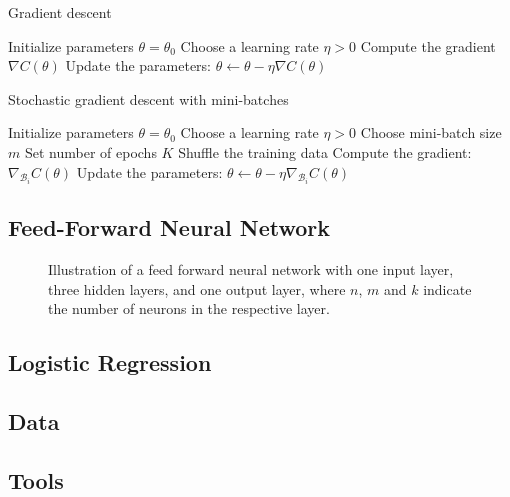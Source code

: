 \begin{algorithm}
\caption{Gradient descent}\label{alg:gd}
\begin{algorithmic}[1]
    \STATE Initialize parameters $\theta = \theta_0$
    \STATE Choose a learning rate $\eta > 0$
    \REPEAT
        \STATE Compute the gradient $\nabla C(\theta)$
        \STATE Update the parameters: $\theta \leftarrow \theta - \eta \nabla C(\theta)$
\end{algorithmic}
\end{algorithm}

\begin{algorithm}
\caption{Stochastic gradient descent with mini-batches}\label{alg:sgd}
\begin{algorithmic}[1]
    \STATE Initialize parameters $\theta = \theta_0$
    \STATE Choose a learning rate $\eta > 0$
    \STATE Choose mini-batch size $m$
    \STATE Set number of epochs $K$
        \STATE Shuffle the training data
            \STATE Compute the gradient: $\nabla_{\mathcal{B}_i} C(\theta)$
            \STATE Update the parameters: $\theta \leftarrow \theta - \eta \nabla_{\mathcal{B}_i} C(\theta)$
        \ENDFOR
    \ENDFOR
\end{algorithmic}
\end{algorithm}

\subsection{Feed-Forward Neural Network}\label{ssec:ffnn}


\begin{figure}[h]
    \centering
    \resizebox{0.9\linewidth}{!}
    {}
    \caption{Illustration of a feed forward neural network with one input layer, three hidden layers, and one output layer, where $n$, $m$ and $k$ indicate the number of neurons in the respective layer.}
    \label{fig:enter-label}
\end{figure}


\subsection{Logistic Regression}\label{ssec:logreg}


\subsection{Data}\label{ssec:data}


\subsection{Tools}\label{ssec:tools}